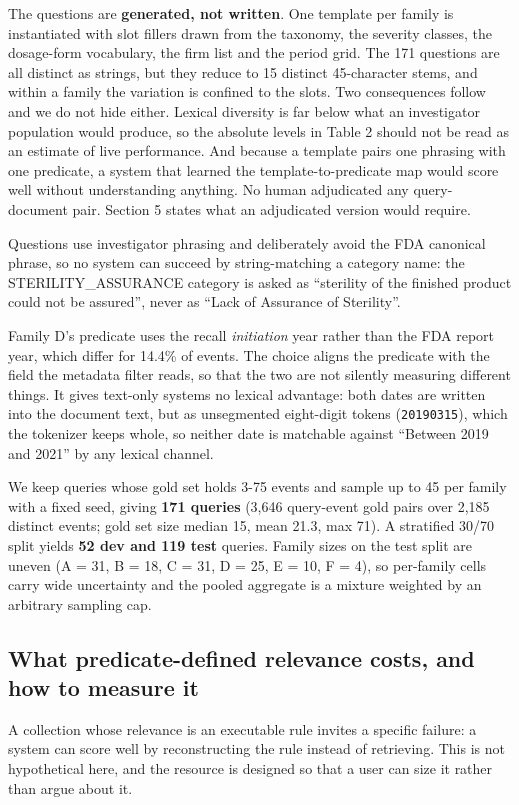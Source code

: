 \documentclass[runningheads]{llncs}
\begin{document}
The questions are \textbf{generated, not written}. One template per family is instantiated with slot fillers drawn from the taxonomy, the severity classes, the dosage-form vocabulary, the firm list and the period grid. The 171 questions are all distinct as strings, but they reduce to 15 distinct 45-character stems, and within a family the variation is confined to the slots. Two consequences follow and we do not hide either. Lexical diversity is far below what an investigator population would produce, so the absolute levels in Table 2 should not be read as an estimate of live performance. And because a template pairs one phrasing with one predicate, a system that learned the template-to-predicate map would score well without understanding anything. No human adjudicated any query-document pair. Section 5 states what an adjudicated version would require.

Questions use investigator phrasing and deliberately avoid the FDA canonical phrase, so no system can succeed by string-matching a category name: the STERILITY\_ASSURANCE category is asked as ``sterility of the finished product could not be assured'', never as ``Lack of Assurance of Sterility''.

Family D's predicate uses the recall \textit{initiation} year rather than the FDA report year, which differ for 14.4\% of events. The choice aligns the predicate with the field the metadata filter reads, so that the two are not silently measuring different things. It gives text-only systems no lexical advantage: both dates are written into the document text, but as unsegmented eight-digit tokens (\texttt{20190315}), which the tokenizer keeps whole, so neither date is matchable against ``Between 2019 and 2021'' by any lexical channel.

We keep queries whose gold set holds 3-75 events and sample up to 45 per family with a fixed seed, giving \textbf{171 queries} (3,646 query-event gold pairs over 2,185 distinct events; gold set size median 15, mean 21.3, max 71). A stratified 30/70 split yields \textbf{52 dev and 119 test} queries. Family sizes on the test split are uneven (A = 31, B = 18, C = 31, D = 25, E = 10, F = 4), so per-family cells carry wide uncertainty and the pooled aggregate is a mixture weighted by an arbitrary sampling cap.


\subsection{What predicate-defined relevance costs, and how to measure it}
A collection whose relevance is an executable rule invites a specific failure: a system can score well by reconstructing the rule instead of retrieving. This is not hypothetical here, and the resource is designed so that a user can size it rather than argue about it.
\end{document}
